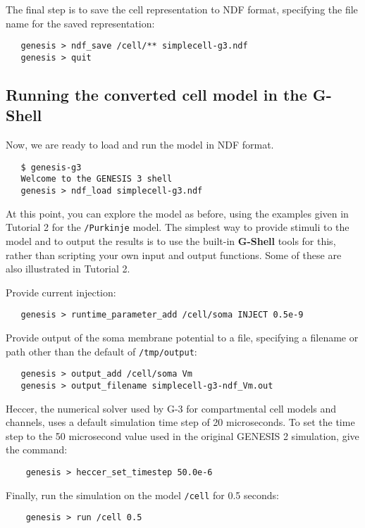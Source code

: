 \documentclass[12pt]{article}
\begin{document}
The final step is to save the cell representation to NDF format,
specifying the file name for the saved representation:
\begin{verbatim}
   genesis > ndf_save /cell/** simplecell-g3.ndf
   genesis > quit
\end{verbatim}

\subsection*{Running the converted cell model in the G-Shell}

Now, we are ready to load and run the model in NDF format.
\begin{verbatim}
   $ genesis-g3
   Welcome to the GENESIS 3 shell
   genesis > ndf_load simplecell-g3.ndf
\end{verbatim}
At this point, you can explore the model as before, using the examples
given in Tutorial 2 for the {\tt /Purkinje} model.  The simplest
way to provide stimuli to the model and to output the results
is to use the built-in {\bf G-Shell} tools for this, rather than scripting
your own input and output functions.  Some of these are also illustrated
in Tutorial 2.

Provide current injection:
\begin{verbatim}
   genesis > runtime_parameter_add /cell/soma INJECT 0.5e-9
\end{verbatim}

Provide output of the soma membrane potential to a file, specifying
a filename or path other than the default of {\tt /tmp/output}:
\begin{verbatim}
   genesis > output_add /cell/soma Vm
   genesis > output_filename simplecell-g3-ndf_Vm.out
\end{verbatim}

Heccer, the numerical solver used by G-3 for compartmental cell models and channels,
uses a default simulation time step of 20 microseconds.  To set the time step to the
50 microsecond value used in the original GENESIS 2 simulation, give the command:

\begin{verbatim}
    genesis > heccer_set_timestep 50.0e-6
\end{verbatim}

Finally, run the simulation on the model {\tt /cell} for 0.5 seconds:
\begin{verbatim}
    genesis > run /cell 0.5
\end{verbatim}
\end{document}
